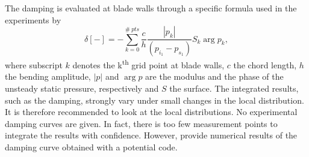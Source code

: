 The damping is evaluated at blade walls through a specific formula
used in the experiments by \citet{Fransson1999}
\begin{equation}
    \delta [-] = - \sum^{\#~pts}_{k=0} \frac{c}{h} 
      \frac{|p_k|}{(p_{i_1} - p_{s_1})} S_k \arg p_k,
\end{equation}
where subscript $k$ denotes the k\textsuperscript{th}
grid point at blade walls, $c$ the chord length,
$h$ the bending amplitude, $| p |$ 
and $\arg p$ are the modulus and the phase of the
unsteady static pressure, respectively and $S$ the surface.
The integrated
results, such as the damping, strongly vary under small changes in the
local distribution. It is therefore recommended to look at the local
distributions. No experimental damping curves are given. In fact,
there is too few measurement points to integrate the results with
confidence. However, \citet{Fransson1999}
provide numerical results of the damping curve obtained with a potential code.

